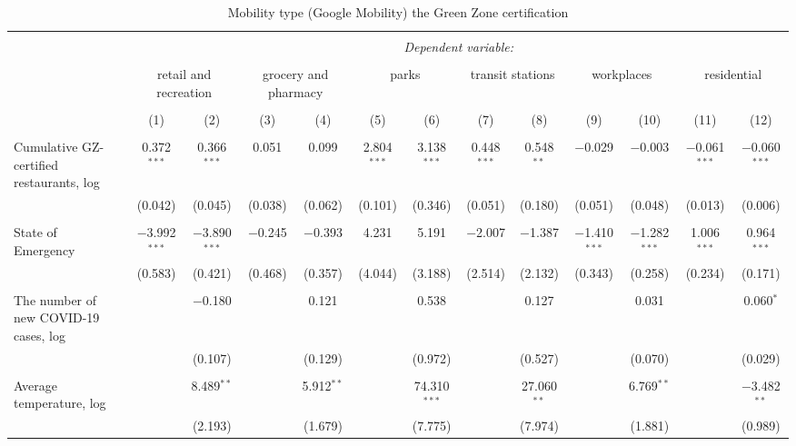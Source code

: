 
\begin{sidewaystable}[!htbp] \centering 
  \caption{Mobility type (Google Mobility) the Green Zone certification} 
  \label{} 
\footnotesize 
\begin{tabular}{@{\extracolsep{-12pt}}lcccccccccccc} 
\\[-1.8ex]\hline 
\hline \\[-1.8ex] 
 & \multicolumn{12}{c}{\textit{Dependent variable:}} \\ 
\cline{2-13} 
\\[-1.8ex] & \multicolumn{2}{c}{retail and recreation} & \multicolumn{2}{c}{grocery and pharmacy} & \multicolumn{2}{c}{parks} & \multicolumn{2}{c}{transit stations} & \multicolumn{2}{c}{workplaces} & \multicolumn{2}{c}{residential} \\ 
\\[-1.8ex] & (1) & (2) & (3) & (4) & (5) & (6) & (7) & (8) & (9) & (10) & (11) & (12)\\ 
\hline \\[-1.8ex] 
 Cumulative GZ-certified restaurants, log & 0.372$^{***}$ & 0.366$^{***}$ & 0.051 & 0.099 & 2.804$^{***}$ & 3.138$^{***}$ & 0.448$^{***}$ & 0.548$^{**}$ & $-$0.029 & $-$0.003 & $-$0.061$^{***}$ & $-$0.060$^{***}$ \\ 
  & (0.042) & (0.045) & (0.038) & (0.062) & (0.101) & (0.346) & (0.051) & (0.180) & (0.051) & (0.048) & (0.013) & (0.006) \\ 
  & & & & & & & & & & & & \\ 
 State of Emergency & $-$3.992$^{***}$ & $-$3.890$^{***}$ & $-$0.245 & $-$0.393 & 4.231 & 5.191 & $-$2.007 & $-$1.387 & $-$1.410$^{***}$ & $-$1.282$^{***}$ & 1.006$^{***}$ & 0.964$^{***}$ \\ 
  & (0.583) & (0.421) & (0.468) & (0.357) & (4.044) & (3.188) & (2.514) & (2.132) & (0.343) & (0.258) & (0.234) & (0.171) \\ 
  & & & & & & & & & & & & \\ 
 The number of new COVID-19 cases, log &  & $-$0.180 &  & 0.121 &  & 0.538 &  & 0.127 &  & 0.031 &  & 0.060$^{*}$ \\ 
  &  & (0.107) &  & (0.129) &  & (0.972) &  & (0.527) &  & (0.070) &  & (0.029) \\ 
  & & & & & & & & & & & & \\ 
 Average temperature, log &  & 8.489$^{**}$ &  & 5.912$^{**}$ &  & 74.310$^{***}$ &  & 27.060$^{**}$ &  & 6.769$^{**}$ &  & $-$3.482$^{**}$ \\ 
  &  & (2.193) &  & (1.679) &  & (7.775) &  & (7.974) &  & (1.881) &  & (0.989) \\ 

\end{tabular}
\end{sidewaystable}
